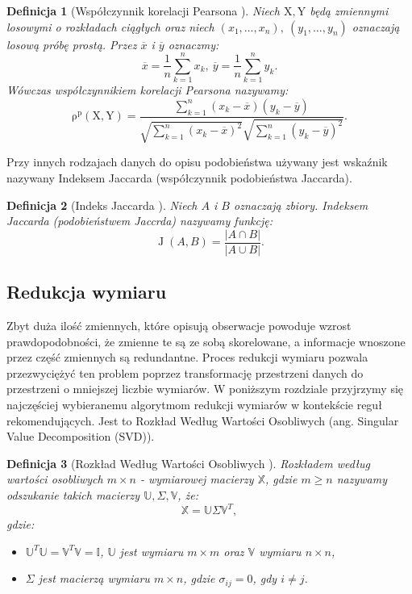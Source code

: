 \documentclass[12pt,a4paper]{report}
\newtheorem{df}{Definicja}[chapter]
\newcommand{\rop}[2]{\operatorname{\rho^p}\left( {#1},{#2} \right)}
\newcommand{\J}[2]{\operatorname{J}\left({#1}, {#2} \right)}
\begin{document}
\begin{df}[Współczynnik korelacji Pearsona \citep{rsh}]

Niech $\mathrm{X},\mathrm{Y}$ będą zmiennymi losowymi o rozkładach ciągłych oraz niech $(x_1, \ldots, x_n), \: (y_1, \ldots, y_n)$ oznaczają losową próbę prostą. 
Przez $\overline{x}$ i $\overline{y}$ oznaczmy:
$$
\overline{x}=\frac{1}{n} \sum_{k=1}^n x_k, \: \overline{y}=\frac{1}{n} \sum_{k=1}^n y_k.
$$
Wówczas współczynnikiem korelacji Pearsona nazywamy:
$$
\rop{\mathrm{X}}{\mathrm{Y}} = \frac{\sum_{k=1}^n(x_k - \overline{x})(y_k - \overline{y})}{\sqrt{\sum_{k=1}^n(x_k - \overline{x})^2} \sqrt{\sum_{k=1}^n(y_k - \overline{y})^2 }}.
$$
\end{df}

Przy innych rodzajach danych do opisu podobieństwa używany jest wskaźnik nazywany Indeksem Jaccarda (współczynnik podobieństwa Jaccarda). 
\begin{df}[Indeks Jaccarda  \citep{bre}]
Niech $\mathit{A}$ i $\mathit{B}$ oznaczają zbiory. Indeksem Jaccarda (podobieństwem Jaccrda) nazywamy funkcję:
$$
\J{\mathit{A}}{\mathit{B}}=\frac{|\mathit{A}\cap \mathit{B}|}{|\mathit{A} \cup \mathit{B}|}.
$$
\end{df}

\subsection{Redukcja wymiaru}
Zbyt duża ilość zmiennych, które opisują obserwacje powoduje wzrost prawdopodobności, że zmienne te są ze sobą skorelowane, a informacje wnoszone przez część zmiennych są redundantne. Proces redukcji wymiaru pozwala przezwyciężyć ten problem poprzez transformację przestrzeni danych do przestrzeni o mniejszej liczbie wymiarów. W poniższym rozdziale przyjrzymy się najczęściej wybieranemu algorytmom redukcji wymiarów w kontekście reguł rekomendujących. Jest to Rozkład Według Wartości Osobliwych (ang. Singular Value Decomposition (SVD)).

\begin{df} [Rozkład Według Wartości Osobliwych {\citep{ulafiir}}]%
Rozkładem według wartości osobliwych $m\times n$ - wymiarowej macierzy $\mathbb{X}$, gdzie $m\geq n$ nazywamy odszukanie takich macierzy $\mathbb{U}, \Sigma, \mathbb{V}$, że:
$$
\mathbb{X}=\mathbb{U} \Sigma \mathbb{V}^T,
$$
gdzie:
\begin{itemize}
\item $\mathbb{U}^T \mathbb{U} = \mathbb{V}^T \mathbb{V} = \mathbb{I}$, $\mathbb{U}$ jest wymiaru $m \times m$ oraz $\mathbb{V}$ wymiaru $n \times n$,
\item $\Sigma$ jest macierzą wymiaru $m \times n$, gdzie $\sigma_{ij} = 0$, gdy $i \neq j$.	
\end{itemize}
\end{df}
\end{document}
